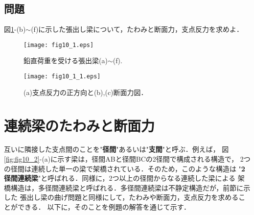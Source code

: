 \documentclass[10pt,a4j]{jbook}
\begin{document}
\subsection{問題}
図\ref{fig:fig10_1}-(b)$\sim$(f)に示した張出し梁について，たわみと断面力，支点反力を求めよ．
\begin{figure}[h]
	\begin{center}
	\texttt{[image: fig10\_1.eps]} 
	\end{center}
	\caption{
	鉛直荷重を受ける張出梁(a)$\sim$(f).
	} 
	\label{fig:fig10_1}
\end{figure}
\begin{figure}[h]
	\begin{center}
	\texttt{[image: fig10\_1\_1.eps]} 
	\end{center}
	\caption{
	(a)支点反力の正方向と(b),(c)断面力図．
	} 
	\label{fig:fig10_1_1}
\end{figure}
%
%
%
\section{連続梁のたわみと断面力}
互いに隣接した支点間のことを"{\bf 径間}"あるいは"{\bf 支間}"と呼ぶ．例えば，
図\ref{fig:fig10_2}-(a)に示す梁は，径間ABと径間BCの2径間で構成される構造で，
2つの径間は連続した単一の梁で架橋されている．そのため，このような構造は
"{\bf 2径間連続梁}"と呼ばれる．同様に，2つ以上の径間からなる連続した梁による
架橋構造は，多径間連続梁と呼ばれる．多径間連続梁は不静定構造だが，前節に示した
張出し梁の曲げ問題と同様にして，たわみや断面力，支点反力を求めることができる．
以下に，そのことを例題の解答を通じて示す．
\end{document}
